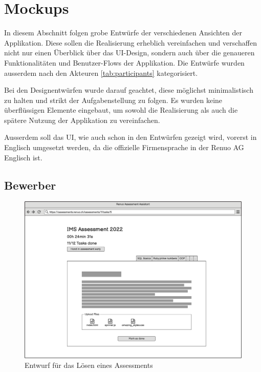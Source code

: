 \newpage

\section{Mockups} \label{sec:mockups}

In diesem Abschnitt folgen grobe Entwürfe der verschiedenen Ansichten der Applikation. Diese sollen die Realisierung
erheblich vereinfachen und verschaffen nicht nur einen Überblick über das UI-Design, sondern auch über die genaueren
Funktionalitäten und Benutzer-Flows der Applikation. Die Entwürfe wurden ausserdem nach den Akteuren \ref{tab:participants} kategorisiert.

Bei den Designentwürfen wurde darauf geachtet, diese möglichst minimalistisch zu halten und strikt der Aufgabenstellung zu folgen.
Es wurden keine überflüssigen Elemente eingebaut, um sowohl die Realisierung als auch die spätere Nutzung der Applikation zu vereinfachen.

Ausserdem soll das UI, wie auch schon in den Entwürfen gezeigt wird, vorerst in Englisch umgesetzt werden, da die  offizielle Firmensprache
in der Renuo AG Englisch ist.

\subsection{Bewerber}
\begin{figure}[H]
    \centering
    \includegraphics[width=12cm]{images/mockups/candidate-solve-assessment.png}
    \caption{\label{fig:mockup-candidate-solve-assessment}Entwurf für das Lösen eines Assessments}
\end{figure}


